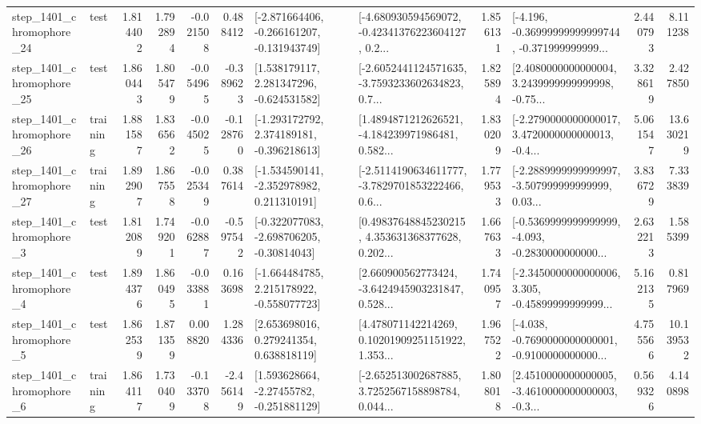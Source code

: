 \begin{tabular}{llrrrrllrlrr}
 step\_1401\_chromophore\_24 &      test &      1.814402 &    1.792894 &     -0.021508 &  0.488412 &  [-2.871664406, -0.266161207, -0.131943749] &  [-4.680930594569072, -0.42341376223604127, 0.2... &       1.856131 &  [-4.196, -0.36999999999999744, -0.371999999999... &            2.440793 &          8.111238 \\
 step\_1401\_chromophore\_25 &      test &      1.860443 &    1.805479 &     -0.054965 & -0.389623 &    [1.538179117, 2.281347296, -0.624531582] &  [-2.6052441124571635, -3.7593233602634823, 0.7... &       1.825894 &  [2.4080000000000004, 3.2439999999999998, -0.75... &            3.328619 &          2.427850 \\
 step\_1401\_chromophore\_26 &  training &      1.881587 &    1.836562 &     -0.045025 & -0.128760 &   [-1.293172792, 2.374189181, -0.396218613] &  [1.4894871212626521, -4.184239971986481, 0.582... &       1.830209 &  [-2.2790000000000017, 3.4720000000000013, -0.4... &            5.061547 &         13.630219 \\
 step\_1401\_chromophore\_27 &  training &      1.892907 &    1.867558 &     -0.025349 &  0.387614 &   [-1.534590141, -2.352978982, 0.211310191] &  [-2.5114190634611777, -3.7829701853222466, 0.6... &       1.779533 &  [-2.2889999999999997, -3.507999999999999, 0.03... &            3.836729 &          7.333839 \\
  step\_1401\_chromophore\_3 &      test &      1.812089 &    1.749201 &     -0.062887 & -0.597542 &   [-0.322077083, -2.698706205, -0.30814043] &  [0.49837648845230215, 4.353631368377628, 0.202... &       1.667633 &  [-0.5369999999999999, -4.093, -0.2830000000000... &            2.632213 &          1.585399 \\
  step\_1401\_chromophore\_4 &      test &      1.894376 &    1.860495 &     -0.033881 &  0.163698 &   [-1.664484785, 2.215178922, -0.558077723] &  [2.660900562773424, -3.6424945903231847, 0.528... &       1.740957 &  [-2.3450000000000006, 3.305, -0.45899999999999... &            5.162135 &          0.817969 \\
  step\_1401\_chromophore\_5 &      test &      1.862539 &    1.871359 &      0.008820 &  1.284336 &     [2.653698016, 0.279241354, 0.638818119] &  [4.478071142214269, 0.10201909251151922, 1.353... &       1.967522 &  [-4.038, -0.7690000000000001, -0.9100000000000... &            4.755566 &         10.139532 \\
  step\_1401\_chromophore\_6 &  training &      1.864117 &    1.730409 &     -0.133708 & -2.456149 &    [1.593628664, -2.27455782, -0.251881129] &  [-2.652513002687885, 3.7252567158898784, 0.044... &       1.808018 &  [2.4510000000000005, -3.4610000000000003, -0.3... &            0.569326 &          4.140898 \\

\end{tabular}
